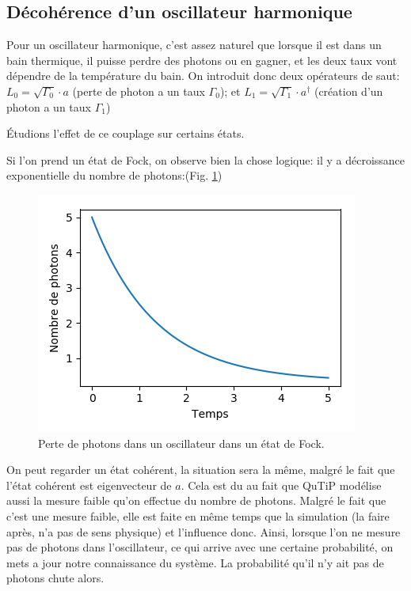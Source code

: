 \documentclass[11pt,a4paper]{article}
\begin{document}
	
	
	\subsection{Décohérence d'un oscillateur harmonique}
	Pour un oscillateur harmonique, c'est assez naturel que lorsque il est dans un bain thermique, il puisse perdre des photons ou en gagner, et les deux taux vont dépendre de la température du bain.
	On introduit donc deux opérateurs de saut: $L_0=\sqrt{\Gamma_0}\cdot a$ (perte de photon a un taux $\Gamma_0$); et $L_1=\sqrt{\Gamma_1}\cdot a^{\dag}$ (création d'un photon a un taux $\Gamma_1$)
	
	Étudions l'effet de ce couplage sur certains états.
	
	Si l'on prend un état de Fock, on observe bien la chose logique: il y a décroissance exponentielle du nombre de photons:(Fig. \ref{fig:Fock_deco_conti})
	\begin{figure}
		\centering
		\includegraphics[width=0.7\linewidth]{Fock_deco_conti}
		\caption{Perte de photons dans un oscillateur dans un état de Fock.}
		\label{fig:Fock_deco_conti}
	\end{figure}
	
	On peut regarder un état cohérent, la situation sera la même, malgré le fait que l'état cohérent est eigenvecteur de $a$. Cela est du au fait que QuTiP modélise aussi la mesure faible qu'on effectue du nombre de photons. Malgré le fait que c'est une mesure faible, elle est faite en même temps que la simulation (la faire après, n'a pas de sens physique) et l'influence donc. Ainsi, lorsque l'on ne mesure pas de photons dans l'oscillateur, ce qui arrive avec une certaine probabilité, on mets a jour notre connaissance du système. La probabilité qu'il n'y ait pas de photons chute alors.
	
\end{document}

